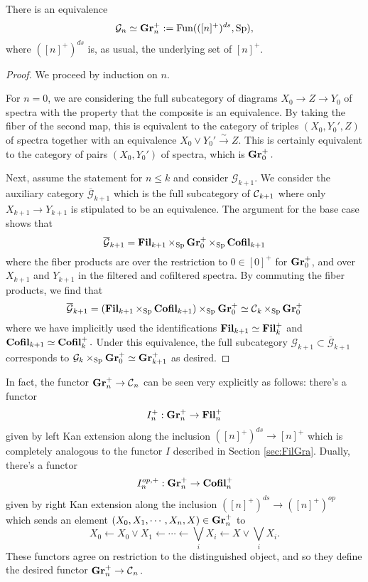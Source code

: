 \begin{lem}
There is an equivalence $$\mathcal{G}_n \simeq \operatorname{\mathbf{Gr}}_n^+ := \operatorname{\text{Fun}}(([n]^{+})^{ds}, \operatorname{\mathrm{Sp}}),$$
where $([n]^+)^{ds}$ is, as usual, the underlying set of $[n]^+$.  
\end{lem}
\begin{proof}
We proceed by induction on $n$.  

For $n=0$, we are considering the full subcategory of diagrams $X_0 \to Z \to Y_0$ of spectra with the property that the composite is an equivalence.  By taking the fiber of the second map, this is equivalent to the category of triples $(X_0, Y_0',Z)$ of spectra together with an equivalence $X_0 \vee Y_0' \xrightarrow{\sim} Z.$   This is  certainly equivalent to the category of pairs $(X_0, Y_0')$ of spectra, which is $\operatorname{\mathbf{Gr}}_0^+.$  

Next, assume the statement for $n\leq k$ and consider $\mathcal{G}_{k+1}.$  We consider the auxiliary category $\overline{\mathcal{G}}_{k+1}$ which is the full subcategory of $\operatorname{\mathcal{C}}_{k+1}$ where only $X_{k+1} \to Y_{k+1}$ is stipulated to be an equivalence.    The argument for the base case shows that $$\overline{\mathcal{G}}_{k+1} = \operatorname{\mathbf{Fil}}_{k+1} \times_{\operatorname{\mathrm{Sp}}} \operatorname{\mathbf{Gr}}_0^+ \times_{\operatorname{\mathrm{Sp}}} \operatorname{\mathbf{Cofil}}_{k+1}$$ where the fiber products are over the restriction to $0\in [0]^+$ for $\operatorname{\mathbf{Gr}}_0^+$, and over $X_{k+1}$ and $Y_{k+1}$ in the filtered and cofiltered spectra.  By commuting the fiber products, we find that $$\overline{\mathcal{G}}_{k+1} = (\operatorname{\mathbf{Fil}}_{k+1} \times_{\operatorname{\mathrm{Sp}}} \operatorname{\mathbf{Cofil}}_{k+1}) \times_{\operatorname{\mathrm{Sp}}} \operatorname{\mathbf{Gr}}_0^+  \simeq \operatorname{\mathcal{C}}_k \times_{\operatorname{\mathrm{Sp}}} \operatorname{\mathbf{Gr}}_0^+$$ where we have implicitly used the identifications $\operatorname{\mathbf{Fil}}_{k+1} \simeq \operatorname{\mathbf{Fil}}_k^+$ and $\operatorname{\mathbf{Cofil}}_{k+1} \simeq \operatorname{\mathbf{Cofil}}_k^+.$   Under this equivalence, the full subcategory $\mathcal{G}_{k+1} \subset \overline{\mathcal{G}}_{k+1}$ corresponds to $\mathcal{G}_k \times_{\operatorname{\mathrm{Sp}}} \operatorname{\mathbf{Gr}}_0^+ \simeq \operatorname{\mathbf{Gr}}_{k+1}^+$ as desired.  

\end{proof}



In fact, the functor $\operatorname{\mathbf{Gr}}_n^+ \to \operatorname{\mathcal{C}}_n$ can be seen very explicitly as follows: there's a functor $$I_n^+: \operatorname{\mathbf{Gr}}_n^+ \to \operatorname{\mathbf{Fil}}_n^+$$ given by left Kan extension along the inclusion $([n]^+)^{ds} \to [n]^+$ which is completely analogous to the functor $I$ described in Section \ref{sec:FilGra}.  Dually, there's a functor $$I_n^{op,+}:\operatorname{\mathbf{Gr}}_n^+ \to \operatorname{\mathbf{Cofil}}_n^+$$ given by right Kan extension along the inclusion $([n]^+)^{ds} \to ([n]^+)^{op}$ which sends an element $(X_0, X_1, \cdots, X_n, X)\in \operatorname{\mathbf{Gr}}_n^+$ to $$X_0 \longleftarrow X_0\vee X_1 \longleftarrow \cdots \longleftarrow \bigvee_i X_i \longleftarrow X \vee \bigvee_i X_i.$$  These functors agree on restriction to the distinguished object, and so they define the desired functor $\operatorname{\mathbf{Gr}}_n^+ \to \operatorname{\mathcal{C}}_n.$  


